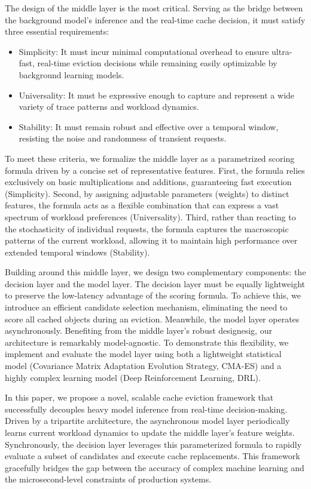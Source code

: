 \documentclass[10pt,journal]{IEEEtran}
\theoremstyle{slantedlemma}
\begin{document}
The design of the middle layer is the most critical. Serving as the bridge between the background model's inference and the real-time cache decision, it must satisfy three essential requirements:
\begin{itemize}
    \item Simplicity: It must incur minimal computational overhead to ensure ultra-fast, real-time eviction decisions while remaining easily optimizable by background learning models.
    \item Universality: It must be expressive enough to capture and represent a wide variety of trace patterns and workload dynamics.
    \item Stability: It must remain robust and effective over a temporal window, resisting the noise and randomness of transient requests.
\end{itemize}

To meet these criteria, we formalize the middle layer as a parametrized scoring formula driven by a concise set of representative features.
First, the formula relies exclusively on basic multiplications and additions, guaranteeing fast execution (Simplicity).
Second,
by assigning adjustable parameters (weights) to distinct features, the formula acts as a flexible combination that can express a vast spectrum of workload preferences (Universality).
Third, rather than reacting to the stochasticity of individual requests, the formula captures the macroscopic patterns of the current workload, allowing it to maintain high performance over extended temporal windows (Stability).

Building around this middle layer, we design two complementary components: the decision layer and the model layer.
The decision layer must be equally lightweight to preserve the low-latency advantage of the scoring formula.
To achieve this, we introduce an efficient candidate selection mechanism, eliminating the need to score all cached objects during an eviction.
Meanwhile, the model layer operates asynchronously. Benefiting from the middle layer's robust designesig, our architecture is remarkably model-agnostic.
To demonstrate this flexibility, we implement and evaluate the model layer using both a lightweight statistical model (Covariance Matrix Adaptation Evolution Strategy, CMA-ES) and a highly complex learning model (Deep Reinforcement Learning, DRL).

In this paper, we propose a novel, scalable cache eviction framework that successfully decouples heavy model inference from real-time decision-making.
Driven by a tripartite architecture, the asynchronous model layer periodically learns current workload dynamics to update the middle layer's feature weights.
Synchronously, the decision layer leverages this parameterized formula to rapidly evaluate a subset of candidates and execute cache replacements.
This framework gracefully bridges the gap between the accuracy of complex machine learning and the microsecond-level constraints of production systems.
\end{document}
